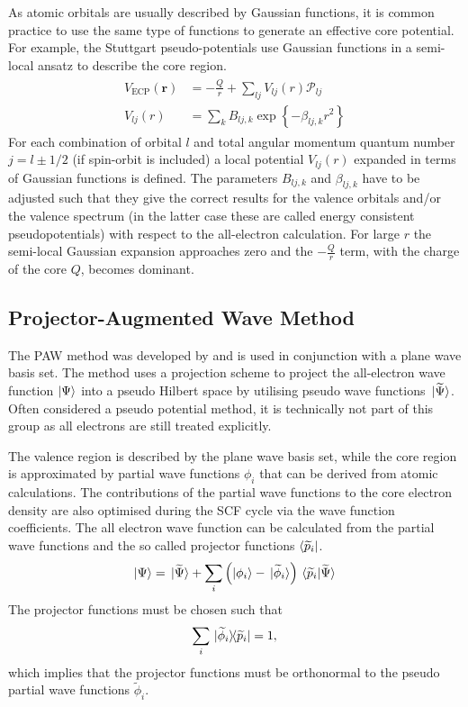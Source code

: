 As atomic orbitals are usually described by Gaussian functions, it is common
practice to use the same type of functions to generate an effective core potential.
For example, the Stuttgart pseudo-potentials use Gaussian functions in
a semi-local ansatz to describe the core region.\autocite{Figgen_Energyconsistentpseudopotentialsgroup_2005}
%
\begin{align}
    \begin{aligned}
        V_\text{ECP}(\mathbf{r})&=-\frac{Q}{r} + \sum_{lj}V_{lj}(r)\mathscr{P}_{lj}\\
        V_{lj}(r)&=\sum_kB_{lj,k}\exp\left\{-\beta_{lj,k}r^2\right\}
    \end{aligned}
\end{align}
%
For each combination of orbital $l$ and total angular momentum quantum number
$j=l\pm 1/2$ (if spin-orbit is included) a local potential $V_{lj}(r)$ expanded in terms of Gaussian
functions is defined. The parameters $B_{lj,k}$ and $\beta_{lj,k}$ have to be
adjusted such that they give the correct results for the valence orbitals and/or the valence spectrum 
(in the latter case these are called energy consistent pseudopotentials) 
with respect to the all-electron calculation. For large $r$ the semi-local Gaussian expansion
approaches zero and the $-\frac{Q}{r}$ term, with the charge of the core $Q$,
becomes dominant. 

\subsection{Projector-Augmented Wave Method}
\label{sec:PAW}

The \ac{PAW} method was developed by
\citeauthor{Blochl_Projectoraugmentedwavemethod_1994}\autocite{Blochl_Projectoraugmentedwavemethod_1994}
and is used in conjunction with a plane wave basis set. The method uses a
projection scheme to project the all-electron wave function $\ket{\Psi}$ into a
pseudo Hilbert space by utilising pseudo wave functions
$\ket*{\widetilde{\Psi}}$. Often considered a pseudo potential method, it is
technically not part of this group as all electrons are still treated
explicitly.

The valence region is described by the plane wave basis set, while the core
region is approximated by partial wave functions $\phi_i$ that can be derived
from atomic calculations. The contributions of the partial wave functions to
the core electron density are also optimised during the \ac{SCF} cycle via the
wave function coefficients. The all electron wave function can be calculated
from the partial wave functions and the so called projector functions
$\bra{\widetilde{p}_i}$.
%
\begin{align}
    \ket{\Psi} = \ket*{\widetilde{\Psi}} + \sum_i\left(\ket{\phi_i}-\ket*{\widetilde{\phi}_i}\right)\braket*{\widetilde{p}_i}{\widetilde{\Psi}}
\end{align}
%
The projector functions must be chosen such that
%
\begin{align}
    \sum_i\dyad*{\widetilde{\phi}_i}{\widetilde{p}_i} = 1,
\end{align}
%
which implies that the projector functions must be orthonormal to the pseudo
partial wave functions $\widetilde{\phi}_i$.


